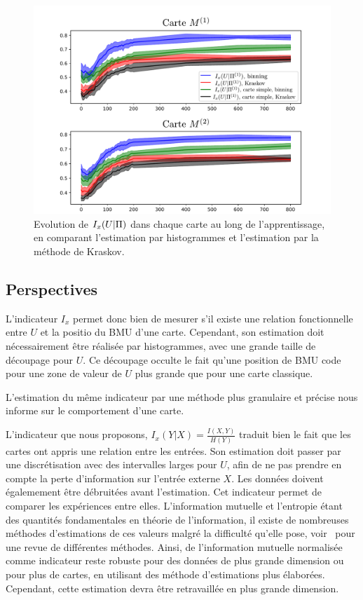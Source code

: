 \begin{figure}
\includegraphics[width=\textwidth]{evolution_MI}
\caption{Evolution de $I_x(U|\Pi)$ dans chaque carte au long de l'apprentissage, en comparant l'estimation par histogrammes et l'estimation par la méthode de Kraskov.}
\label{fig:MI_evol_total}
\end{figure}



\subsection{Perspectives}

L'indicateur $I_x$ permet donc bien de mesurer s'il existe une relation fonctionnelle entre $U$ et la positio du BMU d'une carte. Cependant, son estimation doit nécessairement être réalisée par histogrammes, avec une grande taille de découpage pour $U$. Ce découpage occulte le fait qu'une position de BMU code pour une zone de valeur de $U$ plus grande que pour une carte classique. 

L'estimation du même indicateur par une méthode plus granulaire et précise nous informe sur le comportement d'une carte.

L'indicateur que nous proposons, $I_x(Y|X) = \frac{I(X,Y)}{H(Y)}$ traduit bien le fait que les cartes ont appris une relation entre les entrées. Son estimation doit passer par une discrétisation avec des intervalles larges pour $U$, afin de ne pas prendre en compte la perte d'information sur l'entrée externe $X$.
Les données doivent égalemement être débruitées avant l'estimation.
Cet indicateur permet de comparer les expériences entre elles.
L'information mutuelle et l'entropie étant des quantités fondamentales en théorie de l'information, il existe de nombreuses méthodes d'estimations de ces valeurs malgré la difficulté qu'elle pose, voir~\cite{Doquire2012ACO} pour une revue de différentes méthodes. Ainsi, de l'information mutuelle normalisée comme indicateur reste robuste pour des données de plus grande dimension ou pour plus de cartes, en utilisant des méthode d'estimations plus élaborées. Cependant, cette estimation devra être retravaillée en plus grande dimension. 


